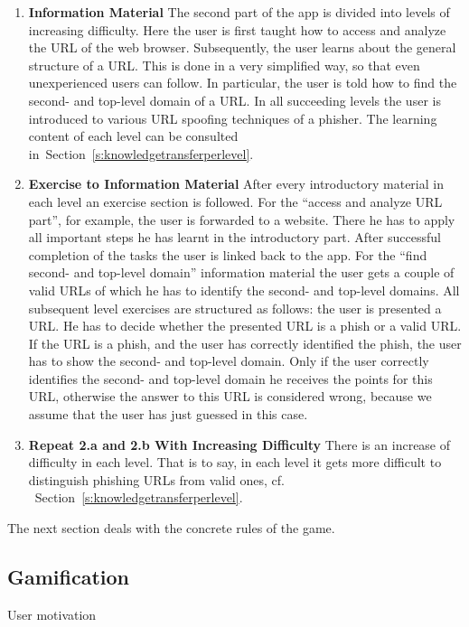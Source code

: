 \begin{enumerate}
\begin{enumerate}
	\item \textbf{Information Material} The second part of the app is divided into levels of increasing difficulty.
 Here the user is first taught how to access and analyze the URL of the web browser.
 Subsequently, the user learns about the general structure of a URL.
 This is done in a very simplified way, so that even unexperienced users can follow.
 In particular, the user is told how to find the second- and top-level domain of a URL.
 In all succeeding levels the user is introduced to various URL spoofing techniques of a phisher.
 The learning content of each level can be consulted in~Section~\ref{s:knowledgetransferperlevel}.
		\item \textbf{Exercise to Information Material} After every introductory material in each level an exercise section is followed.
 For the ``access and analyze URL part'', for example, the user is forwarded to a website.
 There he has to apply all important steps he has learnt in the introductory part.
 After successful completion of the tasks the user is linked back to the app.
 For the ``find second- and top-level domain'' information material the user gets a couple of valid URLs of which he has to identify the second- and top-level domains.
 All subsequent level exercises are structured as follows: the user is presented a URL.
 He has to decide whether the presented URL is a phish or a valid URL.
 If the URL is a phish, and the user has correctly identified the phish, the user has to show the second- and top-level domain.
 Only if the user correctly identifies the second- and top-level domain he receives the points for this URL, otherwise the answer to this URL is considered wrong, because we assume that the user has just guessed in this case.

		\item \textbf{Repeat 2.a and 2.b With Increasing Difficulty} There is an increase of difficulty in each level.
 That is to say, in each level it gets more difficult to distinguish phishing URLs from valid ones, cf.
~Section~\ref{s:knowledgetransferperlevel}.
\end{enumerate}
\end{enumerate}

The next section deals with the concrete rules of the game.

\subsection{Gamification}
User motivation

